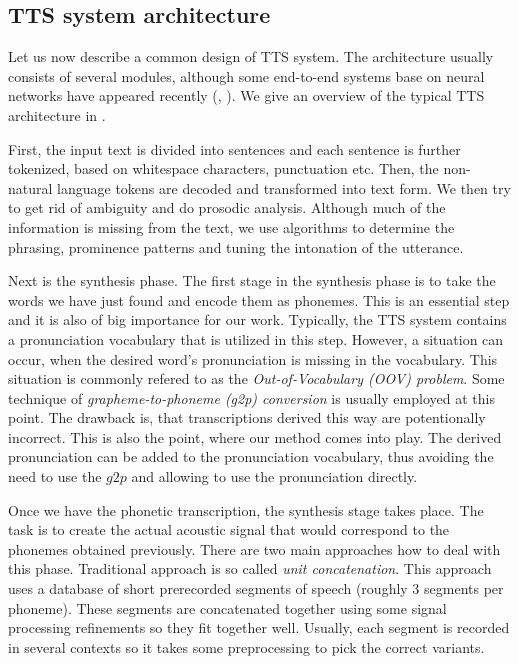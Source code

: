 \subsection{TTS system architecture}
Let us now describe a common design of TTS system.
The architecture usually consists of several modules, although some end-to-end systems base on neural networks have appeared recently (\cite{van2016wavenet}, \cite{wang2017tacotron}).
We give an overview of the typical TTS architecture in .
\par
First, the input text is divided into sentences and each sentence is further tokenized, based on whitespace characters, punctuation etc.
Then, the non-natural language tokens are decoded and transformed into text form.
We then try to get rid of ambiguity and do prosodic analysis.
Although much of the information is missing from the text, we use algorithms to determine the phrasing, prominence patterns and tuning the intonation of the utterance.
\par
Next is the synthesis phase.
The first stage in the synthesis phase is to take the words we have just found and encode them as phonemes.
This is an essential step and it is also of big importance for our work.
Typically, the TTS system contains a pronunciation vocabulary that is utilized in this step.
However, a situation can occur, when the desired word's pronunciation is missing in the vocabulary.
This situation is commonly refered to as the \textit{Out-of-Vocabulary (OOV) problem}.
Some technique of \textit{grapheme-to-phoneme (g2p) conversion} is usually employed at this point.
The drawback is, that transcriptions derived this way are potentionally incorrect.
This is also the point, where our method comes into play.
The derived pronunciation can be added to the pronunciation vocabulary, thus avoiding the need to use the $g2p$ and allowing to use the pronunciation directly.
\par
Once we have the phonetic transcription, the synthesis stage takes place.
The task is to create the actual acoustic signal that would correspond to the phonemes obtained previously.
There are two main approaches how to deal with this phase.
Traditional approach is so called \textit{unit concatenation}.
This approach uses a database of short prerecorded segments of speech (roughly 3 segments per phoneme).
These segments are concatenated together using some signal processing refinements so they fit together well.
Usually, each segment is recorded in several contexts so it takes some preprocessing to pick the correct variants.
